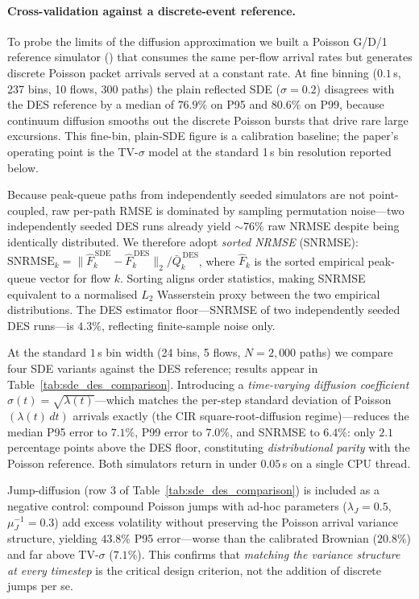 \documentclass{ieeeaccess}
\begin{document}
\paragraph{Cross-validation against a discrete-event reference.}
To probe the limits of the diffusion approximation we built a Poisson G/D/1 reference simulator
() that consumes the same per-flow arrival rates but
generates discrete Poisson packet arrivals served at a constant rate.  At fine binning
($0.1$\,s, 237 bins, 10 flows, 300 paths) the plain reflected SDE ($\sigma=0.2$) disagrees with
the DES reference by a median of $76.9\%$ on P95 and $80.6\%$ on P99, because continuum
diffusion smooths out the discrete Poisson bursts that drive rare large excursions.
This fine-bin, plain-SDE figure is a calibration baseline; the paper's operating point is
the TV-$\sigma$ model at the standard 1\,s bin resolution reported below.

Because peak-queue paths from independently seeded simulators are not point-coupled, raw
per-path RMSE is dominated by sampling permutation noise—two independently seeded DES runs
already yield $\sim\!76\%$ raw NRMSE despite being identically distributed.  We therefore
adopt \emph{sorted NRMSE} (SNRMSE): $\mathrm{SNRMSE}_k = \bigl\|\hat{F}_k^{\,\mathrm{SDE}}
- \hat{F}_k^{\,\mathrm{DES}}\bigr\|_2 / \bar{Q}_k^{\,\mathrm{DES}}$, where $\hat{F}_k$
is the sorted empirical peak-queue vector for flow $k$.  Sorting aligns order statistics,
making SNRMSE equivalent to a normalised $L_2$ Wasserstein proxy between the two empirical
distributions.  The DES estimator floor—SNRMSE of two independently seeded DES runs—is
$4.3\%$, reflecting finite-sample noise only.

At the standard $1$\,s bin width (24 bins, 5 flows, $N=2{,}000$ paths) we compare four SDE
variants against the DES reference; results appear in Table~\ref{tab:sde_des_comparison}.
Introducing a \emph{time-varying diffusion coefficient} $\sigma(t)=\sqrt{\lambda(t)}$—which
matches the per-step standard deviation of Poisson$(\lambda(t)\,dt)$ arrivals exactly (the CIR
square-root-diffusion regime)—reduces the median P95 error to $7.1\%$, P99 error to $7.0\%$,
and SNRMSE to $6.4\%$: only $2.1$ percentage points above the DES floor, constituting
\emph{distributional parity} with the Poisson reference.  Both simulators return in under
$0.05$\,s on a single CPU thread.

Jump-diffusion (row 3 of Table~\ref{tab:sde_des_comparison}) is included as a negative
control: compound Poisson jumps with ad-hoc parameters ($\lambda_J{=}0.5$,
$\mu_J^{-1}{=}0.3$) add excess volatility without preserving the Poisson arrival variance
structure, yielding $43.8\%$ P95 error---worse than the calibrated Brownian ($20.8\%$) and
far above TV-$\sigma$ ($7.1\%$). This confirms that \emph{matching the variance structure at
every timestep} is the critical design criterion, not the addition of discrete jumps per se.
\end{document}
